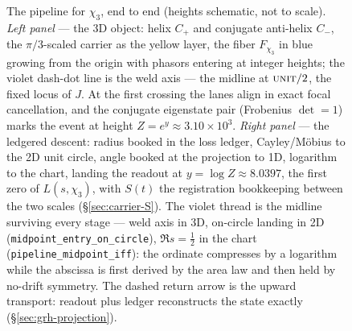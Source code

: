 \begin{figure}[p]
{}
\caption{The pipeline for \(\chi_3\), end to end (heights schematic, not to
scale). \emph{Left panel} --- the 3D object: helix \(C_{+}\) and conjugate
anti-helix \(C_{-}\), the \(\pi/3\)-scaled carrier as the yellow layer, the
fiber \(F_{\chi_3}\) in blue growing from the origin with phasors entering
at integer heights; the violet dash-dot line is the weld axis --- the
midline at \(\textsc{unit}/2\), the fixed locus of \(J\). At the first
crossing the lanes align in exact focal cancellation, and the conjugate
eigenstate pair (Frobenius \(\det=1\)) marks the event at height
\(Z=e^{y}\approx3.10\times10^{3}\). \emph{Right panel} --- the ledgered
descent: radius booked in the loss ledger, Cayley/M\"obius to the 2D unit
circle, angle booked at the projection to 1D, logarithm to the chart,
landing the readout at \(y=\log Z\approx 8.0397\), the first zero of
\(L(s,\chi_3)\), with \(S(t)\) the registration bookkeeping between the two
scales (\S\ref{sec:carrier-S}). The violet thread is the midline surviving
every stage --- weld axis in 3D, on-circle landing in 2D
(\texttt{midpoint\_entry\_on\_circle}), \(\Re s=\tfrac12\) in the chart
(\texttt{pipeline\_midpoint\_iff}): the ordinate compresses by a logarithm
while the abscissa is first derived by the area law and then held by
no-drift symmetry. The dashed return arrow is the
upward transport: readout plus ledger reconstructs the state exactly
(\S\ref{sec:grh-projection}).}
\label{fig:grh-pipeline}
\end{figure}

